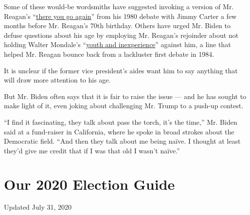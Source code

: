 Some of these would-be wordsmiths have suggested invoking a version of
Mr. Reagan's
``\href{https://www.realclearpolitics.com/lists/debatemoments/reagan_carter.html}{there
you go again}'' from his 1980 debate with Jimmy Carter a few months
before Mr. Reagan's 70th birthday. Others have urged Mr. Biden to defuse
questions about his age by employing Mr. Reagan's rejoinder about not
holding Walter Mondale's
``\href{https://www.youtube.com/watch?v=22Lr4fgSFAY}{youth and
inexperience}'' against him, a line that helped Mr. Reagan bounce back
from a lackluster first debate in 1984.

It is unclear if the former vice president's aides want him to say
anything that will draw more attention to his age.

But Mr. Biden often says that it is fair to raise the issue --- and he
has sought to make light of it, even joking about challenging Mr. Trump
to a push-up contest.

``I find it fascinating, they talk about pass the torch, it's the
time,'' Mr. Biden said at a fund-raiser in California, where he spoke in
broad strokes about the Democratic field. ``And then they talk about me
being naïve. I thought at least they'd give me credit that if I was that
old I wasn't naïve.''

\hypertarget{our-2020-election-guide}{%
\section{Our 2020 Election Guide}\label{our-2020-election-guide}}

Updated July 31, 2020

